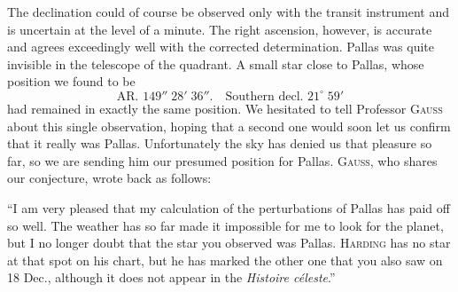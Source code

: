 \par\indent The declination could of course be observed only with the transit instrument and is uncertain at the level of a minute. The right ascension, however, is accurate and agrees exceedingly well with the corrected determination. Pallas was quite invisible in the telescope of the quadrant. A small star close to Pallas, whose position we found to be
\[\text{AR. }149''\;28'\;36''.\quad\text{Southern decl. }21^\circ\;59'\]
\noindent had remained in exactly the same position. We hesitated to tell Professor \textsc{Gauss} about this single observation, hoping that a second one would soon let us confirm that it really was Pallas. Unfortunately the sky has denied us that pleasure so far, so we are sending him our presumed position for Pallas. \textsc{Gauss}, who shares our conjecture, wrote back as follows:

\par\indent “I am very pleased that my calculation of the perturbations of Pallas has paid off so well. The weather has so far made it impossible for me to look for the planet, but I no longer doubt that the star you observed was Pallas. \textsc{Harding} has no star at that spot on his chart, but he has marked the other one that you also saw on 18 Dec., although it does not appear in the \emph{Histoire céleste}.”
